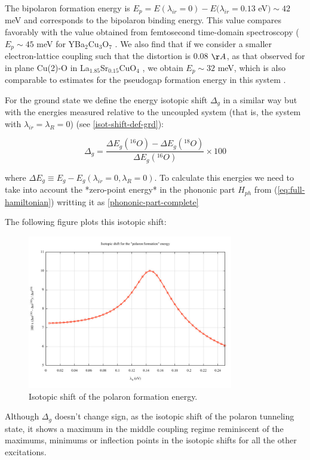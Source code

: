 The bipolaron formation energy is $E_p = E(\lambda_{ir}=0)- E(\lambda_{ir}=0.13$ eV$) \sim 42$ meV and corresponds to the bipolaron binding energy. This value compares favorably with the value obtained from femtosecond time-domain spectroscopy ($E_p \sim 45$ meV for YBa$_2$Cu$_3$O$_7$ \cite{Demsar1999}. We also find that if we consider a smaller electron-lattice coupling such that the distortion is 0.08 $\AA$, as that observed for in plane Cu(2)-O in La$_{1.85}$Sr$_{0.15}$CuO$_4$ \cite{Bianconi1996}, we obtain $E_p \sim 32$ meV, which is also comparable to estimates for the pseudogap formation energy in this system \cite{Kusar2005}.


For the ground state we define the energy isotopic shift $\Delta_g$ in a similar way but with the energies measured relative to the uncoupled system (that is, the system with $\lambda_{ir}=\lambda_R=0$) (see \ref{isot-shift-def-grd}):

\begin{equation}
  \Delta_g = \frac{\Delta E_g(^{16}O)- \Delta E_g(^{18}O)}{\Delta E_g(^{16}O)} \times 100 
\end{equation}

where $\Delta E_g \equiv E_g - E_g(\lambda_{ir}=0, \lambda_R=0)$. To calculate this energies we need to take into account the *zero-point energy* in the phononic part $H_{ph}$ from (\ref{eq:full-hamiltonian}) writting it as \ref{phononic-part-complete}

The following figure plots this isotopic shift:

\begin{figure}[ht!]
  \centering
  \includegraphics[width=0.8\textwidth]{images/isot_polaron_formation.jpg}
  \caption{Isotopic shift of the polaron formation energy.}
  \label{fig:isot_polaron_formation}
\end{figure}

Although $\Delta_g$ doesn't change sign, as the isotopic shift of the polaron tunneling state, it shows a maximum in the middle coupling regime reminiscent of the maximums, minimums or inflection points in the isotopic shifts for all the other excitations.
